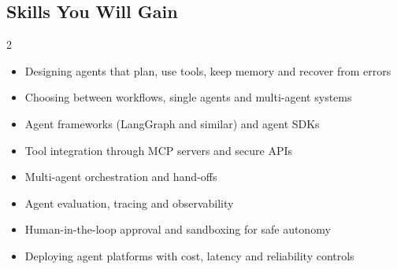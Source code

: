 \documentclass[10pt,a4paper]{article}
\begin{document}
\subsection*{Skills You Will Gain}\begin{multicols}{2}\begin{itemize}\small
\item Designing agents that plan, use tools, keep memory and recover from errors
\item Choosing between workflows, single agents and multi-agent systems
\item Agent frameworks (LangGraph and similar) and agent SDKs
\item Tool integration through MCP servers and secure APIs
\item Multi-agent orchestration and hand-offs
\item Agent evaluation, tracing and observability
\item Human-in-the-loop approval and sandboxing for safe autonomy
\item Deploying agent platforms with cost, latency and reliability controls
\end{itemize}\end{multicols}
\end{document}
